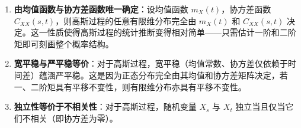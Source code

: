\begin{enumerate}
    \item \textbf{由均值函数与协方差函数唯一确定}：设均值函数 \(m_{X}(t)\)，协方差函数 \(C_{XX}(s, t) \)，则高斯过程的任意有限维分布完全由 \(m_{X}(t)\) 和 \(C_{XX}(s, t)\) 决定。这一性质使得高斯过程的统计推断变得相对简单——只需估计一阶和二阶矩即可刻画整个概率结构。

    \item \textbf{宽平稳与严平稳等价}：对于高斯过程，宽平稳（均值常数、协方差仅依赖于时间差）蕴涵严平稳。这是因为正态分布完全由其均值和协方差矩阵决定，若一、二阶矩具有平移不变性，则有限维分布亦具有平移不变性。

    \item \textbf{独立性等价于不相关性}：对于高斯过程，随机变量 \(X_s\) 与 \(X_t\) 独立当且仅当它们不相关（即协方差为零）。
\end{enumerate}
